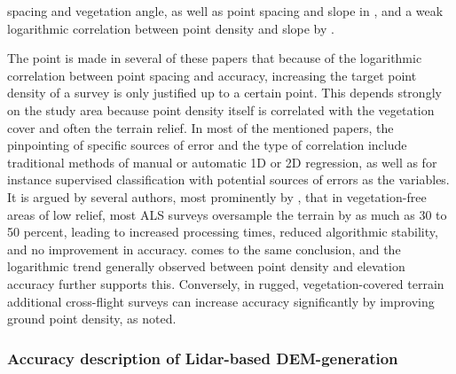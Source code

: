 spacing and vegetation angle, as well as point spacing and slope in \cite{peng_shih_2006}, and a weak logarithmic correlation between point density and slope by \cite{chow_hodgson_2009}.

The point is made in several of these papers that because of the logarithmic correlation between point spacing and accuracy, increasing the target point density of a survey is only justified up to a certain point. This depends strongly on the study area because point density itself is correlated with the vegetation cover and often the terrain relief. In most of the mentioned papers, the pinpointing of specific sources of error and the type of correlation include traditional methods of manual or automatic 1D or 2D regression, as well as for instance supervised classification with potential sources of errors as the variables. It is argued by several authors, most prominently by \cite{guo_etal_2010}, that in vegetation-free areas of low relief, most ALS surveys oversample the terrain by as much as 30 to 50 percent, leading to increased processing times, reduced algorithmic stability, and no improvement in accuracy. \cite{bater_coops_2009} comes to the same conclusion, and the logarithmic trend generally observed between point density and elevation accuracy further supports this. Conversely, in rugged, vegetation-covered terrain additional cross-flight surveys can increase accuracy significantly by improving ground point density, as \cite{peng_shih_2006} noted.

\subsubsection*{Accuracy description of Lidar-based DEM-generation}

